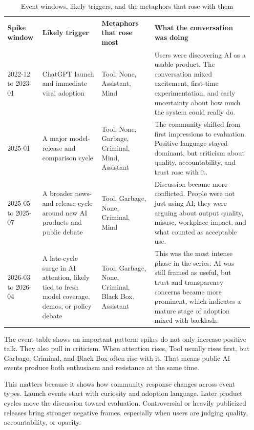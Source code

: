\documentclass[11pt]{article}
\begin{document}
\begin{table}[H]
\centering
\caption{Event windows, likely triggers, and the metaphors that rose with them}
\label{tab:eventwindows}
\begin{tabular}{p{1.7cm} p{3.0cm} p{4.0cm} p{5.0cm}}
\toprule
Spike window & Likely trigger & Metaphors that rose most & What the conversation was doing \\
\midrule
2022-12 to 2023-01 & ChatGPT launch and immediate viral adoption & Tool, None, Assistant, Mind & Users were discovering AI as a usable product. The conversation mixed excitement, first-time experimentation, and early uncertainty about how much the system could really do. \\
2025-01 & A major model-release and comparison cycle & Tool, None, Garbage, Criminal, Mind, Assistant & The community shifted from first impressions to evaluation. Positive language stayed dominant, but criticism about quality, accountability, and trust rose with it. \\
2025-05 to 2025-07 & A broader news-and-release cycle around new AI products and public debate & Tool, Garbage, None, Criminal, Mind & Discussion became more conflicted. People were not just using AI; they were arguing about output quality, misuse, workplace impact, and what counted as acceptable use. \\
2026-03 to 2026-04 & A late-cycle surge in AI attention, likely tied to fresh model coverage, demos, or policy debate & Tool, Garbage, None, Criminal, Black Box, Assistant & This was the most intense phase in the series. AI was still framed as useful, but trust and transparency concerns became more prominent, which indicates a mature stage of adoption mixed with backlash. \\
\bottomrule
\end{tabular}
\end{table}

The event table shows an important pattern: spikes do not only increase positive talk. They also pull in criticism. When attention rises, Tool usually rises first, but Garbage, Criminal, and Black Box often rise with it. That means public AI events produce both enthusiasm and resistance at the same time.

This matters because it shows how community response changes across event types. Launch events start with curiosity and adoption language. Later product cycles move the discussion toward evaluation. Controversial or heavily publicized releases bring stronger negative frames, especially when users are judging quality, accountability, or opacity.
\end{document}
